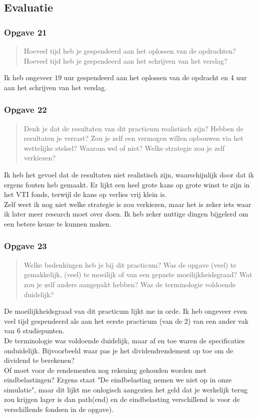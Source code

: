 \documentclass[11pt, a4paper, titlepage, openright]{article}
\begin{document}
	\subsection{Evaluatie}

	\subsubsection{Opgave 21}
		\begin{quote}
			Hoeveel tijd heb je gespendeerd aan het oplossen van de opdrachten?
			Hoeveel tijd heb je gespendeerd aan het schrijven van het verslag?
		\end{quote}
		\noindent Ik heb ongeveer 19 uur gespendeerd aan het oplossen van de opdracht en 4 uur aan het schrijven van het verslag.

	\subsubsection{Opgave 22}
		\begin{quote}
			Denk je dat de resultaten van dit practicum realistisch zijn? Hebben de resultaten je verrast?
			Zou je zelf een vermogen willen opbouwen via het wettelijke stelsel?
			Waarom wel of niet? Welke strategie zou je zelf verkiezen?
		\end{quote}
		\noindent Ik heb het gevoel dat de resultaten niet realistisch zijn, waarschijnlijk door dat ik ergens fouten heb gemaakt. Er lijkt een heel grote kans op grote winst te zijn in het VTI fonds, terwijl de kans op verlies vrij klein is. \\
		Zelf weet ik nog niet welke strategie is zou verkiezen, maar het is zeker iets waar ik later meer research moet over doen. Ik heb zeker nuttige dingen bijgelerd om een betere keuze te kunnen maken.


	\subsubsection{Opgave 23}
		\begin{quote}
			Welke bedenkingen heb je bij dit practicum? Was de opgave (veel) te gemakkelijk, (veel) te moeilijk of
			van een gepaste moeilijkheidsgraad? Wat zou je zelf anders aangepakt hebben?  Was de terminologie voldoende duidelijk?
		\end{quote}
		\noindent De moeilijkheidsgraad van dit practicum lijkt me in orde. Ik heb ongeveer even veel tijd gespendeerd als aan het
		eerste practicum (van de 2) van een ander vak van 6 studiepunten.\\
		De terminologie was voldoende duidelijk, maar af en toe waren de specificaties onduidelijk.
		Bijvoorbeeld waar pas je het dividendrendement op toe om de dividend te berekenen? \\ Of moet voor de rendementen
		nog rekening gehouden worden met eindbelastingen? Ergens staat "De eindbelasting nemen we niet op in onze simulatie",
		maar dit lijkt me onlogisch aangezien het geld dat je werkelijk terug zou krijgen lager is dan path(end) en de
		eindbelasting verschillend is voor de verschillende fondsen in de opgave).
\end{document}
